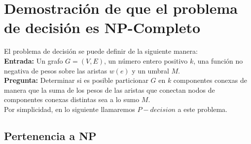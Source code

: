 





% 





\section{Demostración de que el problema de decisión es NP-Completo}

El problema de decisión se puede definir de la 
siguiente manera: \\

\textbf{Entrada:} Un grafo \( G = (V, E) \), un número entero positivo \( k \), 
una función no negativa de pesos sobre las aristas $w(e)$ 
y un umbral \( M \).\\

\textbf{Pregunta:} Determinar si es posible 
particionar \( G \) en \( k \) componentes conexas de 
manera que la suma de los pesos de las aristas que conectan nodos de 
componentes conexas distintas sea a lo sumo \( M \).\\

Por simplicidad, en lo siguiente llamaremos $P-decision$ a este problema. 

\subsection{Pertenencia a NP}

